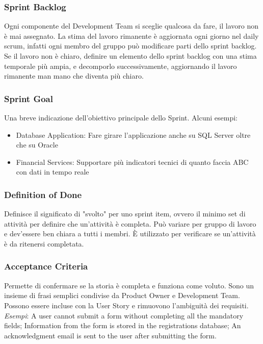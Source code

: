 \documentclass[10pt, a4paper]{article}
\begin{document}
\subsubsection*{Sprint Backlog}
Ogni componente del Development Team si sceglie qualcosa da fare, il lavoro non è mai assegnato. La stima del lavoro rimanente è aggiornata ogni giorno nel daily scrum, infatti ogni membro del gruppo può modificare parti dello sprint backlog.
Se il lavoro non è chiaro, definire un elemento dello sprint backlog con una stima temporale più ampia, e decomporlo successivamente, aggiornando il lavoro rimanente man mano che diventa più chiaro.

\subsubsection*{Sprint Goal}
Una breve indicazione dell'obiettivo principale dello Sprint. Alcuni esempi:
\begin{itemize}
	\item Database Application: Fare girare l’applicazione anche su SQL Server oltre che su Oracle
	\item Financial Services: Supportare più indicatori tecnici di quanto faccia ABC con dati in tempo reale
\end{itemize}

\subsubsection*{Definition of Done}
Definisce il significato di "svolto" per uno sprint item, ovvero il minimo set di attività per definire che un'attività è completa. Può variare per gruppo di lavoro e dev'essere ben chiara a tutti i membri. È utilizzato per verificare se un'attività è da ritenersi completata.

\subsubsection*{Acceptance Criteria}
Permette di confermare se la storia è completa e funziona come voluto. Sono un insieme di frasi semplici condivise da Product Owner e Development Team. Possono essere incluse con la User Story e rimuovono l’ambiguità dei requisiti.\\
\textit{Esempi}: A user cannot submit a form without completing all the mandatory fields; Information from the form is stored in the registrations database; An acknowledgment email is sent to the user after submitting the form.
\end{document}
